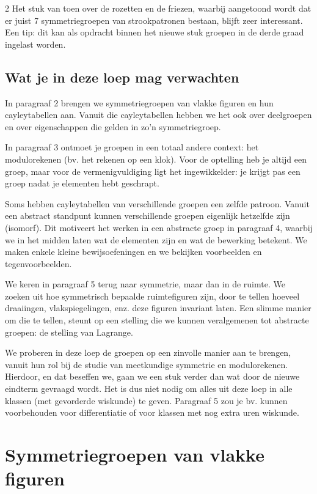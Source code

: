 \begin{multicols}{2}
	 Het stuk van toen over de rozetten en de friezen, waarbij aangetoond wordt dat er juist 7 symmetriegroepen van strookpatronen bestaan, blijft zeer interessant. Een tip: dit kan als opdracht binnen het nieuwe stuk groepen in de derde graad ingelast worden.
	 	
	\subsection*{Wat je in deze loep mag verwachten}
	
	In paragraaf 2 brengen we symmetriegroepen van vlakke figuren en hun cayleytabellen aan. Vanuit die cayleytabellen hebben we het ook over deelgroepen en over eigenschappen die gelden in zo'n symmetriegroep. 
	
	In paragraaf 3 ontmoet je groepen in een totaal andere context: het modulorekenen (bv. het rekenen op een klok). Voor de optelling heb je altijd een groep, maar voor de vermenigvuldiging ligt het ingewikkelder: je krijgt pas een groep nadat je elementen hebt geschrapt.
	
	Soms hebben cayleytabellen van verschillende groepen een zelfde patroon. Vanuit een abstract standpunt kunnen verschillende groepen eigenlijk hetzelfde zijn (isomorf). Dit motiveert het werken in een abstracte groep in paragraaf 4, waarbij we in het midden laten wat de elementen zijn en wat de bewerking betekent. We maken enkele kleine bewijsoefeningen en we bekijken voorbeelden en tegenvoorbeelden. 
	
    We keren in paragraaf 5 terug naar symmetrie, maar dan in de ruimte. We zoeken uit hoe symmetrisch bepaalde ruimtefiguren zijn, door te tellen hoeveel draaiingen, vlakspiegelingen, enz. deze figuren invariant laten. Een slimme manier om die te tellen, steunt op een stelling die we kunnen veralgemenen tot abstracte groepen: de stelling van Lagrange.
    
    We proberen in deze loep de groepen op een zinvolle manier aan te brengen, vanuit hun rol bij de studie van meetkundige symmetrie en modulorekenen. Hierdoor, en dat beseffen we, gaan we een stuk verder dan wat door de nieuwe eindterm gevraagd wordt. Het is dus niet nodig om alles uit deze loep in alle klassen (met gevorderde wiskunde) te geven. Paragraaf 5 zou je bv. kunnen voorbehouden voor differentiatie of voor klassen met nog extra uren wiskunde.
	
	\section{Symmetriegroepen van vlakke figuren}
	

\end{multicols}
